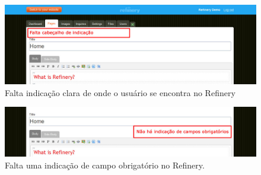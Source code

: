 \begin{figure}[here]
\includegraphics[width=150mm]{images/refinery_erro_cabecalho.jpg}
\caption{Falta indicação clara de onde o usuário se encontra no Refinery }
\label{fig:cabecalho_refinery}
\end{figure}

\begin{figure}[here]
\includegraphics[width=150mm]{images/refinery_erro_campos_obrigatorios.jpg}
\caption{Falta uma indicação de campo obrigatório no Refinery. }
\label{fig:campos_obrigatorios_refinery}
\end{figure}

